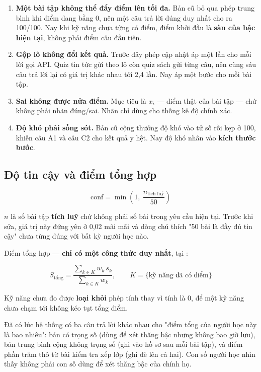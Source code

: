 \begin{enumerate}[leftmargin=1.4em]
  \item \textbf{Một bài tập không thể đẩy điểm lên tối đa.} Bản cũ bỏ qua phép trung bình
  khi điểm đang bằng 0, nên một câu trả lời đúng duy nhất cho ra 100/100. Nay khi kỹ năng
  chưa từng có điểm, điểm khởi đầu là \textbf{sàn của bậc hiện tại}, không phải điểm câu
  đầu tiên.
  \item \textbf{Gộp lô không đổi kết quả.} Trước đây phép cập nhật áp một lần cho mỗi lời
  gọi API. Quiz tin tức gửi theo lô còn quiz sách gửi từng câu, nên cùng sáu câu trả lời
  lại có giá trị khác nhau tới 2,4 lần. Nay áp một bước cho mỗi bài tập.
  \item \textbf{Sai không được nửa điểm.} Mục tiêu là \(x_i\) — điểm thật của bài tập —
  chứ không phải nhãn đúng/sai. Nhãn  chỉ dùng cho thống kê độ chính xác.
  \item \textbf{Độ khó phải sống sót.} Bản cũ cộng thưởng độ khó vào tử số rồi kẹp ở 100,
  khiến câu A1 và câu C2 cho kết quả y hệt. Nay độ khó nhân vào \textbf{kích thước bước}.
\end{enumerate}

\subsection{Độ tin cậy và điểm tổng hợp}

\begin{equation}
\mathrm{conf} = \min\!\left(1,\ \frac{n_{\text{tích luỹ}}}{50}\right)
\end{equation}

\(n\) là số bài tập \textbf{tích luỹ} chứ không phải số bài trong yêu cầu hiện tại. Trước
khi sửa, giá trị này đứng yên ở 0,02 mãi mãi và dòng chú thích "50 bài là đầy đủ tin cậy"
chưa từng đúng với bất kỳ người học nào.

Điểm tổng hợp — \textbf{chỉ có một công thức duy nhất}, tại :

\begin{equation}
S_{\text{tổng}} = \frac{\sum_{k \in K} w_k\, s_k}{\sum_{k \in K} w_k},
\qquad K = \{\text{kỹ năng đã có điểm}\}
\end{equation}

Kỹ năng chưa đo được \textbf{loại khỏi} phép tính thay vì tính là 0, để một kỹ năng chưa
chạm tới không kéo tụt tổng điểm.

\begin{luuy}
Đã có lúc hệ thống có ba câu trả lời khác nhau cho "điểm tổng của người học này là bao
nhiêu": bản có trọng số (dùng để xét thăng bậc nhưng không bao giờ lưu), bản trung bình
cộng không trọng số (ghi vào hồ sơ sau mỗi bài tập), và điểm phần trăm thô từ bài kiểm tra
xếp lớp (ghi đè lên cả hai). Con số người học nhìn thấy không phải con số dùng để xét
thăng bậc của chính họ.
\end{luuy}

